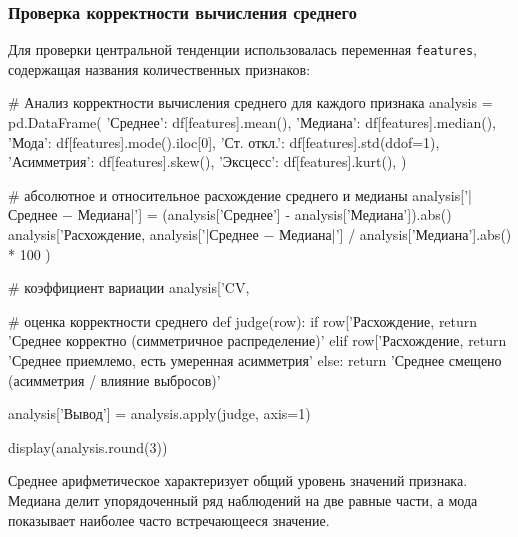 \subsubsection*{Проверка корректности вычисления среднего}
 
Для проверки центральной тенденции использовалась переменная \texttt{features}, содержащая названия количественных признаков:
 
\begin{Code}
# Анализ корректности вычисления среднего для каждого признака
analysis = pd.DataFrame({
	'Среднее': df[features].mean(),
	'Медиана': df[features].median(),
	'Мода': df[features].mode().iloc[0],
	'Ст. откл.': df[features].std(ddof=1),
	'Асимметрия': df[features].skew(),
	'Эксцесс': df[features].kurt(),
})

# абсолютное и относительное расхождение среднего и медианы
analysis['|Среднее − Медиана|'] = (analysis['Среднее'] - analysis['Медиана']).abs()
analysis['Расхождение, %
analysis['|Среднее − Медиана|'] / analysis['Медиана'].abs() * 100
)

# коэффициент вариации
analysis['CV, %

# оценка корректности среднего
def judge(row):
if row['Расхождение, %
return 'Среднее корректно (симметричное распределение)'
elif row['Расхождение, %
return 'Среднее приемлемо, есть умеренная асимметрия'
else:
return 'Среднее смещено (асимметрия / влияние выбросов)'

analysis['Вывод'] = analysis.apply(judge, axis=1)

display(analysis.round(3))
\end{Code}
 
Среднее арифметическое характеризует общий уровень значений признака. Медиана делит упорядоченный ряд наблюдений на две равные части, а мода показывает наиболее часто встречающееся значение.
 

